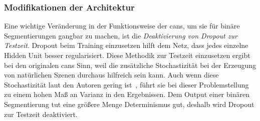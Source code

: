 \subsubsection{Modifikationen der Architektur}

Eine wichtige Veränderung in der Funktionsweise der \glspl{can}, um sie für binäre Segmentierungen gangbar zu machen, ist die \emph{Deaktivierung von Dropout zur Testzeit}.
Dropout beim Training einzusetzen hilft dem Netz, dass jedes einzelne Hidden Unit besser regularisiert.
Diese Methodik zur Testzeit einzusetzen ergibt bei den originalen \glspl{can} Sinn, weil die zusätzliche Stochastizität bei der Erzeugung von natürlichen Szenen durchaus hilfreich sein kann.
Auch wenn diese Stochastizität laut den Autoren gering ist~\cite{Isola.2017}, führt sie bei dieser Problemstellung zu einem hohen Maß an Varianz in den Ergebnissen.
Dem Output einer binären Segmentierung tut eine größere Menge Determinismus gut, deshalb wird Dropout zur Testzeit deaktiviert.

